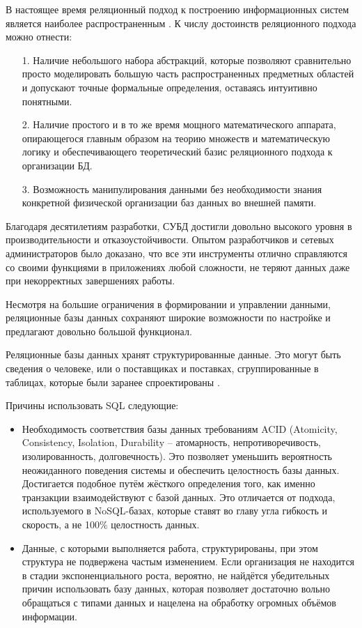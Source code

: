 В настоящее время реляционный подход к построению информационных систем является наиболее распространенным \cite{vuz}. К числу достоинств реляционного подхода можно отнести:

\begin{itemize}
\item[1.] Наличие небольшого набора абстракций, которые позволяют сравнительно просто моделировать большую часть распространенных предметных областей и допускают точные формальные определения, оставаясь интуитивно понятными.
\item[2.] Наличие простого и в то же время мощного математического аппарата, опирающегося главным образом на теорию множеств и математическую логику и обеспечивающего теоретический базис реляционного подхода к организации БД.
\item[3.] Возможность манипулирования данными без необходимости знания конкретной физической организации баз данных во внешней памяти.
\end{itemize}

Благодаря десятилетиям разработки, СУБД достигли довольно высокого уровня в производительности и отказоустойчивости. Опытом разработчиков и сетевых администраторов было доказано, что все эти инструменты отлично справляются со своими функциями в приложениях любой сложности, не теряют данных даже при некорректных завершениях работы.

Несмотря на большие ограничения в формировании и управлении данными, реляционные базы данных сохраняют широкие возможности по настройке и предлагают довольно большой функционал.

Реляционные базы данных хранят структурированные данные. Это могут быть сведения о человеке, или о поставщиках и поставках, сгруппированные в таблицах, которые были заранее спроектированы \cite{sqlnsql3}.

Причины использовать SQL следующие:
\begin{itemize}
	\item Необходимость соответствия базы данных требованиям ACID (Atomicity, Consistency, Isolation, Durability -- атомарность, непротиворечивость, изолированность, долговечность). Это позволяет уменьшить вероятность неожиданного поведения системы и обеспечить целостность базы данных. Достигается подобное путём жёсткого определения того, как именно транзакции взаимодействуют с базой данных. Это отличается от подхода, используемого в NoSQL-базах, которые ставят во главу угла гибкость и скорость, а не 100\% целостность данных.
	
	\item Данные, с которыми выполняется работа, структурированы, при этом структура не подвержена частым изменением. Если организация не находится в стадии экспоненциального роста, вероятно, не найдётся убедительных причин использовать базу данных, которая позволяет достаточно вольно обращаться с типами данных и нацелена на обработку огромных объёмов информации.
\end{itemize}


